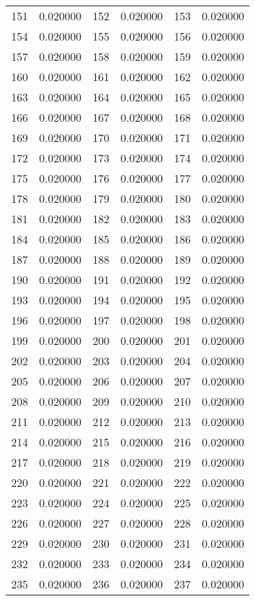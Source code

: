 \documentclass[12pt]{article}
\begin{document}
\begin{longtable}{@{}cc|cc|cc@{}}
151 & 0.020000 & 152 & 0.020000 & 153 & 0.020000 \\
154 & 0.020000 & 155 & 0.020000 & 156 & 0.020000 \\
157 & 0.020000 & 158 & 0.020000 & 159 & 0.020000 \\
160 & 0.020000 & 161 & 0.020000 & 162 & 0.020000 \\
163 & 0.020000 & 164 & 0.020000 & 165 & 0.020000 \\
166 & 0.020000 & 167 & 0.020000 & 168 & 0.020000 \\
169 & 0.020000 & 170 & 0.020000 & 171 & 0.020000 \\
172 & 0.020000 & 173 & 0.020000 & 174 & 0.020000 \\
175 & 0.020000 & 176 & 0.020000 & 177 & 0.020000 \\
178 & 0.020000 & 179 & 0.020000 & 180 & 0.020000 \\
181 & 0.020000 & 182 & 0.020000 & 183 & 0.020000 \\
184 & 0.020000 & 185 & 0.020000 & 186 & 0.020000 \\
187 & 0.020000 & 188 & 0.020000 & 189 & 0.020000 \\
190 & 0.020000 & 191 & 0.020000 & 192 & 0.020000 \\
193 & 0.020000 & 194 & 0.020000 & 195 & 0.020000 \\
196 & 0.020000 & 197 & 0.020000 & 198 & 0.020000 \\
199 & 0.020000 & 200 & 0.020000 & 201 & 0.020000 \\
202 & 0.020000 & 203 & 0.020000 & 204 & 0.020000 \\
205 & 0.020000 & 206 & 0.020000 & 207 & 0.020000 \\
208 & 0.020000 & 209 & 0.020000 & 210 & 0.020000 \\
211 & 0.020000 & 212 & 0.020000 & 213 & 0.020000 \\
214 & 0.020000 & 215 & 0.020000 & 216 & 0.020000 \\
217 & 0.020000 & 218 & 0.020000 & 219 & 0.020000 \\
220 & 0.020000 & 221 & 0.020000 & 222 & 0.020000 \\
223 & 0.020000 & 224 & 0.020000 & 225 & 0.020000 \\
226 & 0.020000 & 227 & 0.020000 & 228 & 0.020000 \\
229 & 0.020000 & 230 & 0.020000 & 231 & 0.020000 \\
232 & 0.020000 & 233 & 0.020000 & 234 & 0.020000 \\
235 & 0.020000 & 236 & 0.020000 & 237 & 0.020000 \\

\end{longtable}
\end{document}
